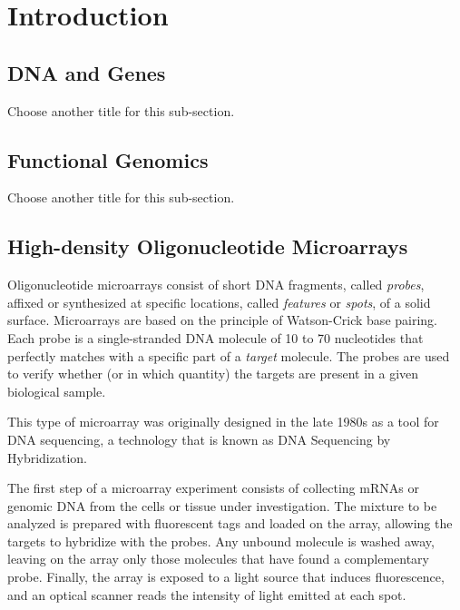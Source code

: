 \chapter{Introduction}
\label{ch:intro}

\section{DNA and Genes}
\label{sec:intro_genes}

Choose another title for this sub-section.

\section{Functional Genomics}
\label{sec:intro_funcgen}

Choose another title for this sub-section.

\section{High-density Oligonucleotide Microarrays}
\label{sec:intro_oligoarrays}

Oligonucleotide microarrays consist of short DNA fragments, called
\emph{probes}, affixed or synthesized at specific locations, called
\emph{features} or \emph{spots}, of a solid surface. Microarrays are
based on the principle of Watson-Crick base pairing. Each probe is a
single-stranded DNA molecule of 10 to 70 nucleotides that perfectly matches
with a specific part of a \emph{target} molecule. The probes are used to
verify whether (or in which quantity) the targets are present in a
given biological sample.

This type of microarray was originally designed in the late 1980s as a tool for
DNA sequencing, a technology that is known as DNA Sequencing by Hybridization.

The first step of a microarray experiment consists of collecting mRNAs
or genomic DNA from the cells or tissue under investigation. The mixture
to be analyzed is prepared with fluorescent tags and loaded on the array,
allowing
the targets to hybridize with the probes. Any unbound molecule is
washed away, leaving on the array only those molecules that have found
a complementary probe. Finally, the array is exposed to a light source
that induces fluorescence, and an optical scanner reads the intensity
of light emitted at each spot.

